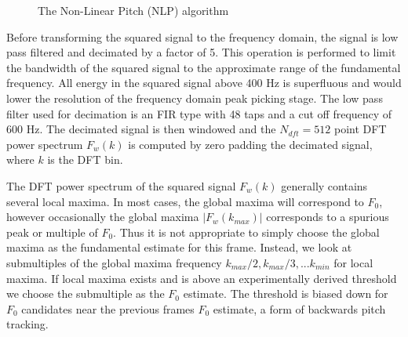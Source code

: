\documentclass{article}
\begin{document}
\begin{figure}[h]
\caption{The Non-Linear Pitch (NLP) algorithm}
\label{fig:nlp}
\begin{center}
\end{center}
\end{figure}

Before transforming the squared signal to the frequency domain, the signal is low pass filtered and decimated by a factor of 5. This operation is performed to limit the bandwidth of the squared signal to the approximate range of the fundamental frequency. All energy in the squared signal above 400 Hz is superfluous and would lower the resolution of the frequency domain peak picking stage. The low pass filter used for decimation is an FIR type with 48 taps and a cut off frequency of 600 Hz. The decimated signal is then windowed and the $N_{dft} = 512$ point DFT power spectrum $F_w(k)$ is computed by zero padding the decimated signal, where $k$ is the DFT bin.

The DFT power spectrum of the squared signal $F_w(k)$ generally contains several local maxima. In most cases, the global maxima will correspond to $F_0$, however occasionally the global maxima $|F_w(k_{max})|$ corresponds to a spurious peak or multiple of $F_0$. Thus it is not appropriate to simply choose the global maxima as the fundamental estimate for this frame. Instead, we look at submultiples of the global maxima frequency $k_{max}/2, k_{max}/3,... k_{min}$ for local maxima.  If local maxima exists and is above an experimentally derived threshold we choose the submultiple as the $F_0$ estimate.  The threshold is biased down for $F_0$ candidates near the previous frames $F_0$ estimate, a form of backwards pitch tracking.
\end{document}
